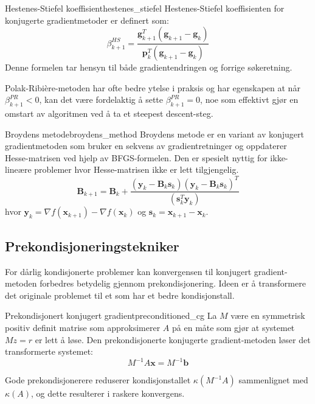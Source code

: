 \begin{definition}{Hestenes-Stiefel koeffisient}{hestenes_stiefel}
	Hestenes-Stiefel koeffisienten for konjugerte gradientmetoder er definert som:
	\[
		\beta_{k+1}^{HS} = \frac{\symbf{g}_{k+1}^T(\symbf{g}_{k+1} - \symbf{g}_k)}{\symbf{p}_k^T(\symbf{g}_{k+1} - \symbf{g}_k)}
	\]
	Denne formelen tar hensyn til både gradientendringen og forrige søkeretning.
\end{definition}

Polak-Ribière-metoden har ofte bedre ytelse i praksis og har egenskapen at når \(\beta_{k+1}^{PR} < 0\), kan det være fordelaktig å sette \(\beta_{k+1}^{PR} = 0\), noe som effektivt gjør en omstart av algoritmen ved å ta et steepest descent-steg.

\begin{corollary}{Broydens metode}{broydens_method}
	Broydens metode er en variant av konjugert gradientmetoden som bruker en sekvens av gradientretninger og oppdaterer Hesse-matrisen ved hjelp av BFGS-formelen. Den er spesielt nyttig for ikke-lineære problemer hvor Hesse-matrisen ikke er lett tilgjengelig.
	\[
		\symbf{B}_{k+1} = \symbf{B}_k + \frac{(\symbf{y}_k - \symbf{B}_k\symbf{s}_k)(\symbf{y}_k - \symbf{B}_k\symbf{s}_k)^T}{(\symbf{s}_k^T \symbf{y}_k)}
	\]
	hvor \(\symbf{y}_k = \nabla f(\symbf{x}_{k+1}) - \nabla f(\symbf{x}_k)\) og \(\symbf{s}_k = \symbf{x}_{k+1} - \symbf{x}_k\).
\end{corollary}

\subsection{Prekondisjoneringstekniker}
\label{subsec:cg_preconditioning}

For dårlig kondisjonerte problemer kan konvergensen til konjugert gradient-metoden forbedres betydelig gjennom prekondisjonering. Ideen er å transformere det originale problemet til et som har et bedre kondisjonstall.

\begin{definition}{Prekondisjonert konjugert gradient}{preconditioned_cg}
	La \(M\) være en symmetrisk positiv definit matrise som approksimerer \(A\) på en måte som gjør at systemet \(Mz = r\) er lett å løse. Den prekondisjonerte konjugerte gradient-metoden løser det transformerte systemet:
	\[
		M^{-1}A\symbf{x} = M^{-1}\symbf{b}
	\]
\end{definition}

Gode prekondisjonerere reduserer kondisjonstallet \(\kappa(M^{-1}A)\) sammenlignet med \(\kappa(A)\), og dette resulterer i raskere konvergens.

